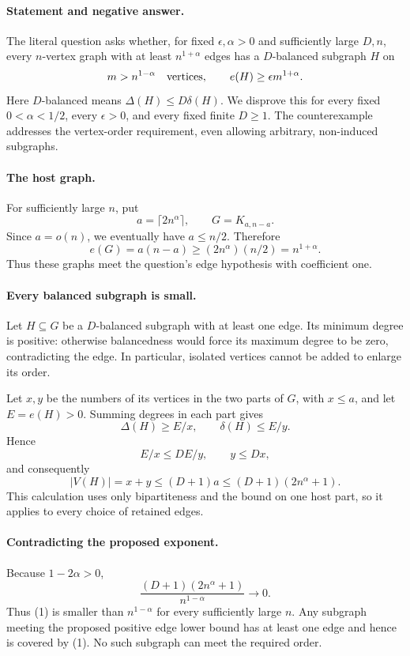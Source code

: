 \paragraph{Statement and negative answer.}
The literal question asks whether, for fixed \(\epsilon,\alpha>0\) and sufficiently large \(D,n\), every \(n\)-vertex graph with at least \(n^{1+\alpha}\) edges has a \(D\)-balanced subgraph \(H\) on
\[
 m>n^{1-\alpha}\quad\hbox{vertices},\qquad
 e(H)\geq\epsilon m^{1+\alpha}.
\]
Here \(D\)-balanced means \(\Delta(H)\leq D\delta(H)\). We disprove this for every fixed \(0<\alpha<1/2\), every \(\epsilon>0\), and every fixed finite \(D\geq1\). The counterexample addresses the vertex-order requirement, even allowing arbitrary, non-induced subgraphs.

\paragraph{The host graph.}
For sufficiently large \(n\), put
\[
 a=\lceil2n^\alpha\rceil,\qquad G=K_{a,n-a}.
\]
Since \(a=o(n)\), we eventually have \(a\leq n/2\). Therefore
\[
 e(G)=a(n-a)\geq(2n^\alpha)(n/2)=n^{1+\alpha}.
\]
Thus these graphs meet the question's edge hypothesis with coefficient one.

\paragraph{Every balanced subgraph is small.}
Let \(H\subseteq G\) be a \(D\)-balanced subgraph with at least one edge. Its minimum degree is positive: otherwise balancedness would force its maximum degree to be zero, contradicting the edge. In particular, isolated vertices cannot be added to enlarge its order.

Let \(x,y\) be the numbers of its vertices in the two parts of \(G\), with \(x\leq a\), and let \(E=e(H)>0\). Summing degrees in each part gives
\[
 \Delta(H)\geq E/x,\qquad \delta(H)\leq E/y.
\]
Hence
\[
 E/x\leq D E/y,\qquad y\leq Dx,
\]
and consequently
\[
 |V(H)|=x+y\leq(D+1)a
 \leq(D+1)(2n^\alpha+1). \tag{1}
\]
This calculation uses only bipartiteness and the bound on one host part, so it applies to every choice of retained edges.

\paragraph{Contradicting the proposed exponent.}
Because \(1-2\alpha>0\),
\[
 \frac{(D+1)(2n^\alpha+1)}{n^{1-\alpha}}\longrightarrow0.
\]
Thus (1) is smaller than \(n^{1-\alpha}\) for every sufficiently large \(n\). Any subgraph meeting the proposed positive edge lower bound has at least one edge and hence is covered by (1). No such subgraph can meet the required order.

